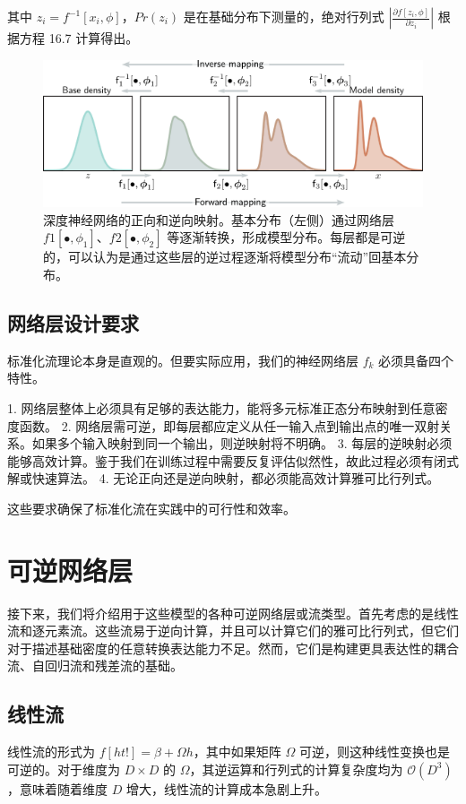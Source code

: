 其中 \(z_i = f^{-1}[x_i, \phi]\)，\(Pr(z_i)\) 是在基础分布下测量的，绝对行列式 \(\left| \frac{\partial f[z_i, \phi]}{\partial z_i} \right|\) 根据方程 16.7 计算得出。

\begin{figure}[ht!]
\centering
\includegraphics[width=0.7\linewidth]{png/chapter16/FlowTransformLayers.png}
\caption{深度神经网络的正向和逆向映射。基本分布（左侧）通过网络层 \(f1[•, \phi_1]\)、\(f2[•, \phi_2]\) 等逐渐转换，形成模型分布。每层都是可逆的，可以认为是通过这些层的逆过程逐渐将模型分布“流动”回基本分布。}
\end{figure}


\subsection{网络层设计要求}
标准化流理论本身是直观的。但要实际应用，我们的神经网络层 \(f_k\) 必须具备四个特性。

1. 网络层整体上必须具有足够的表达能力，能将多元标准正态分布映射到任意密度函数。
2. 网络层需可逆，即每层都应定义从任一输入点到输出点的唯一双射关系。如果多个输入映射到同一个输出，则逆映射将不明确。
3. 每层的逆映射必须能够高效计算。鉴于我们在训练过程中需要反复评估似然性，故此过程必须有闭式解或快速算法。
4. 无论正向还是逆向映射，都必须能高效计算雅可比行列式。

这些要求确保了标准化流在实践中的可行性和效率。
\section{可逆网络层}

接下来，我们将介绍用于这些模型的各种可逆网络层或流类型。首先考虑的是线性流和逐元素流。这些流易于逆向计算，并且可以计算它们的雅可比行列式，但它们对于描述基础密度的任意转换表达能力不足。然而，它们是构建更具表达性的耦合流、自回归流和残差流的基础。

\subsection{线性流}
线性流的形式为 \(f[ht!] = \beta + \Omega h\)，其中如果矩阵 \(\Omega\) 可逆，则这种线性变换也是可逆的。对于维度为 \(D \times D\) 的 \(\Omega\)，其逆运算和行列式的计算复杂度均为 \(\mathcal{O}(D^3)\)，意味着随着维度 \(D\) 增大，线性流的计算成本急剧上升。

